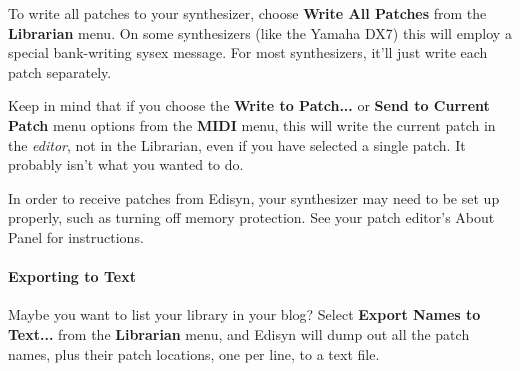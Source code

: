 \documentclass{article}
\begin{document}
To write all patches to your synthesizer, choose {\bf Write All Patches} from the {\bf Librarian} menu.  On some synthesizers (like the Yamaha DX7) this will employ a special bank-writing sysex message. For most synthesizers, it'll just write each patch separately.  

Keep in mind that if you choose the {\bf Write to Patch...} or {\bf Send to Current Patch} menu options from the {\bf MIDI} menu, this will write the current patch in the {\it editor}, not in the Librarian, even if you have selected a single patch.  It probably isn't what you wanted to do.

In order to receive patches from Edisyn, your synthesizer may need to be set up properly, such as turning off memory protection. See your patch editor's About Panel for instructions.

\paragraph{Exporting to Text}
Maybe you want to list your library in your blog?  Select {\bf Export Names to Text...} from the {\bf Librarian} menu, and Edisyn will dump out all the patch names, plus their patch locations, one per line, to a text file.



\newcommand\samefootnote{\addtocounter{footnote}{-1}\footnotemark}
\newcommand\backfootnote[1]{\addtocounter{footnote}{-#1}\footnotemark\addtocounter{footnote}{#1}\addtocounter{footnote}{-1}}
\newcommand\cm{\checkmark}
\end{document}
